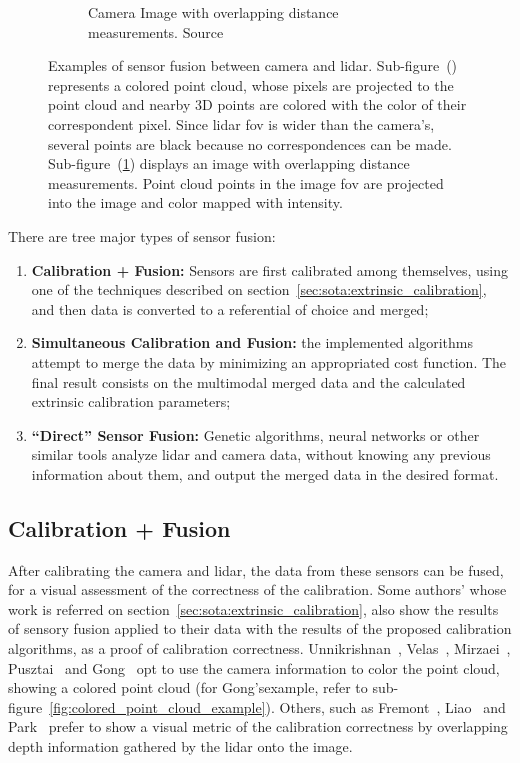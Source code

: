 \begin{figure}[!ht]
\begin{subfigure}[t]{0.40\textwidth}
		\caption{Camera Image with overlapping distance measurements. Source~\cite{Bileschi2009}}
		\label{fig:image_with_lidar_distance}
	\end{subfigure}
	\caption{Examples of sensor fusion between camera and \ac{lidar}. Sub-figure~() represents a colored point cloud, whose pixels are projected to the point cloud and nearby 3D points are colored with the color of their correspondent pixel. Since \ac{lidar} \ac{fov} is wider than the camera's, several points are black because no correspondences can be made. Sub-figure~(\ref{fig:image_with_lidar_distance}) displays an image with overlapping distance measurements. Point cloud points in the image \ac{fov} are projected into the image and color mapped with intensity.}
	\label{fig:point_cloud_camera_fusion_example}
\end{figure}

There are tree major types of sensor fusion: 

\begin{enumerate}
	\item \textbf{Calibration + Fusion:} Sensors are first calibrated among themselves, using one of the techniques described on section~\ref{sec:sota:extrinsic_calibration}, and then data is converted to a referential of choice and merged;
	\item \textbf{Simultaneous Calibration and Fusion:} the implemented algorithms attempt to merge the data by minimizing an appropriated cost function. The final result consists on the multimodal merged data and the calculated extrinsic calibration parameters;
	\item \textbf{``Direct'' Sensor Fusion:} Genetic algorithms, neural networks or other similar tools analyze \ac{lidar} and camera data, without knowing any previous information about them, and output the merged data in the desired format.
\end{enumerate} 


\subsection{Calibration + Fusion}
\label{subsec:sota:calibration-and-fusion}
After calibrating the camera and \ac{lidar}, the data from these sensors can be fused, for a visual assessment of the correctness of the calibration. Some authors' whose work is referred on section~\ref{sec:sota:extrinsic_calibration}, also show the results of sensory fusion applied to their data with the results of the proposed calibration algorithms, as a proof of calibration correctness. Unnikrishnan\etal~\cite{Unnikrishnan2005}, Velas\etal~\cite{MartinVelas2013}, Mirzaei\etal~\cite{Mirzaei2012}, Pusztai\etal~\cite{Pusztai2018} and Gong\etal~\cite{Gong2013} opt to use the camera information to color the point cloud, showing a colored point cloud (for Gong's\etal example, refer to sub-figure~\ref{fig:colored_point_cloud_example}). Others, such as Fremont\etal~\cite{Fremont2013}, Liao\etal~\cite{Liao2019} and Park\etal~\cite{Park2014} prefer to show a visual metric of the calibration correctness by overlapping depth information gathered by the \ac{lidar} onto the image.

